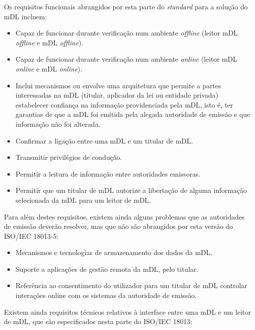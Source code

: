 
Os requisitos funcionais abrangidos por esta parte do \textit{standard} para a solução do mDL incluem:

\begin{itemize}
	\item Capaz de funcionar durante verificação num ambiente \textit{offline} (leitor mDL \textit{offline} e mDL \textit{offline}).
	\item Capaz de funcionar durante verificação num ambiente \textit{online} (leitor mDL \textit{online} e mDL \textit{online}).
	\item Inclui mecanismos ou envolve uma arquitetura que permite a partes interessadas na mDL (titular, aplicador da lei ou entidade privada) estabelecer confiança na informação providenciada pela mDL, isto é, ter garantias de que a mDL foi emitida pela alegada autoridade de emissão e que informação não foi alterada.
	\item Confirmar a ligação entre uma mDL e um titular de mDL.
	\item Transmitir privilégios de condução.
	\item Permitir a leitura de informação entre autoridades emissoras.
	\item Permitir que um titular de mDL autorize a libertação de alguma informação selecionada da mDL para um leitor de mDL.
\end{itemize}

Para além destes requisitos, existem ainda alguns problemas que as autoridades de emissão deverão resolver, mas que não são abrangidos por esta versão do ISO/IEC 18013-5:

\begin{itemize}
	\item Mecanismos e tecnologias de armazenamento dos dados da mDL.
	\item Suporte a aplicações de gestão remota da mDL, pelo titular.
	\item Referência ao consentimento do utilizador para um titular de mDL controlar interações online com os sistemas da autoridade de emissão.
\end{itemize}

Existem ainda requisitos técnicos relativos à interface entre uma mDL e um leitor de mDL, que são especificados nesta parte do ISO/IEC 18013:


